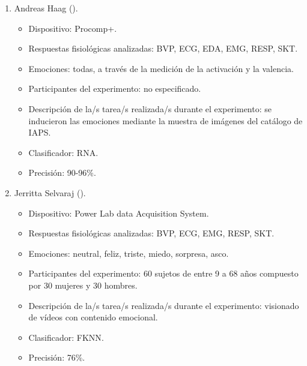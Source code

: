 \begin{enumerate}
    \item Andreas Haag (\citeyear{haag2004emotion}).
    \begin{itemize}
        \item Dispositivo: Procomp+.
        \item Respuestas fisiológicas analizadas: BVP, ECG, EDA, EMG, RESP, SKT.
        \item Emociones: todas, a través de la medición de la activación y la valencia.
        \item Participantes del experimento: no especificado.        
        \item Descripción de la/s tarea/s realizada/s durante el experimento: se inducieron las emociones mediante la muestra de imágenes del catálogo de \ac{IAPS}.
        \item Clasificador: \ac{RNA}.
        \item Precisión: 90-96\%.
    \end{itemize}

    \item Jerritta Selvaraj (\citeyear{selvaraj2013classification}).
    \begin{itemize}
        \item Dispositivo: Power Lab data Acquisition System.
        \item Respuestas fisiológicas analizadas: BVP, ECG, EMG, RESP, SKT.
        \item Emociones: neutral, feliz, triste, miedo, sorpresa, asco.
        \item Participantes del experimento: 60 sujetos de entre 9 a 68 años compuesto por 30 mujeres y 30 hombres.
        \item Descripción de la/s tarea/s realizada/s durante el experimento: visionado de vídeos con contenido emocional.
        \item Clasificador: \ac{FKNN}.
        \item Precisión: 76\%.
    \end{itemize}


\end{enumerate}
